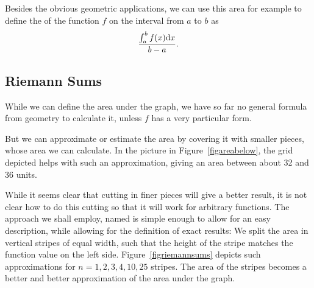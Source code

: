 Besides the obvious geometric applications, we can use this area for example to define the  of the function $f$ on the
interval from $a$ to $b$ as
\[
\frac{\int_a^b f(x){\mbox{d}}x}{b-a}.
\]

\subsection{Riemann Sums}

While we can define the area under the graph, we have so far no general
formula from geometry to calculate it, unless $f$ has a very particular
form.

But we can approximate or estimate the area by covering it with smaller
pieces, whose area we can calculate. In the picture in
Figure~\ref{figareabelow}, the grid depicted helps with such an
approximation, giving an area between about 32 and 36 units.

While it seems clear that cutting in finer pieces will give a better result,
it is not clear how to do this cutting so that it will work for arbitrary
functions. The approach we shall employ, named  is
simple enough to allow for an easy description, while allowing for the
definition of exact results: We split the area in vertical stripes of equal
width, such that the height of the stripe matches the function value on the
left side. Figure~\ref{figriemannsums} depicts such approximations for
$n=1,2,3,4,10,25$ stripes. The area of the stripes becomes a better and
better approximation of the area under the graph.


